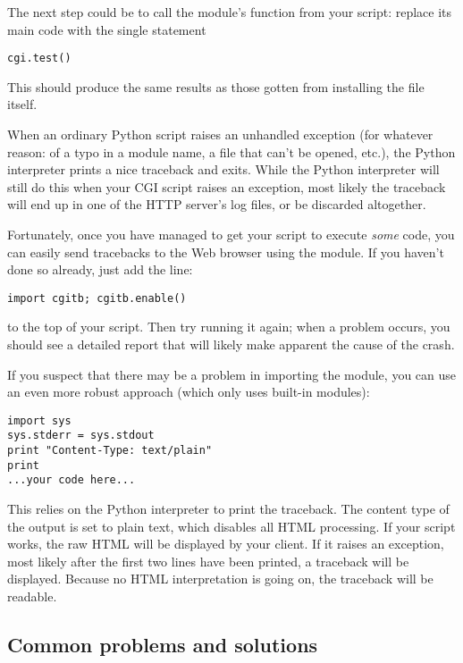 The next step could be to call the  module's
 function from your script: replace its main code
with the single statement

\begin{verbatim}
cgi.test()
\end{verbatim}

This should produce the same results as those gotten from installing
the  file itself.

When an ordinary Python script raises an unhandled exception (for
whatever reason: of a typo in a module name, a file that can't be
opened, etc.), the Python interpreter prints a nice traceback and
exits.  While the Python interpreter will still do this when your CGI
script raises an exception, most likely the traceback will end up in
one of the HTTP server's log files, or be discarded altogether.

Fortunately, once you have managed to get your script to execute
\emph{some} code, you can easily send tracebacks to the Web browser
using the  module.  If you haven't done so already,
just add the line:

\begin{verbatim}
import cgitb; cgitb.enable()
\end{verbatim}

to the top of your script.  Then try running it again; when a
problem occurs, you should see a detailed report that will
likely make apparent the cause of the crash.

If you suspect that there may be a problem in importing the
 module, you can use an even more robust approach
(which only uses built-in modules):

\begin{verbatim}
import sys
sys.stderr = sys.stdout
print "Content-Type: text/plain"
print
...your code here...
\end{verbatim}

This relies on the Python interpreter to print the traceback.  The
content type of the output is set to plain text, which disables all
HTML processing.  If your script works, the raw HTML will be displayed
by your client.  If it raises an exception, most likely after the
first two lines have been printed, a traceback will be displayed.
Because no HTML interpretation is going on, the traceback will be
readable.


\subsection{Common problems and solutions}

